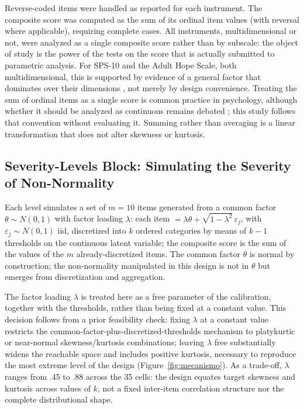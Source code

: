 \documentclass[man,mask,donotrepeattitle,floatsintext]{apa7}
\begin{document}
Reverse-coded items were handled as reported for each instrument. The composite score was computed as the sum of its ordinal item values (with reversal where applicable), requiring complete cases. All instruments, multidimensional or not, were analyzed as a single composite score rather than by subscale: the object of study is the power of the tests on the score that is actually submitted to parametric analysis. For SPS-10 and the Adult Hope Scale, both multidimensional, this is supported by evidence of a general factor that dominates over their dimensions \parencite{sischka2025,gomez2014}, not merely by design convenience. Treating the sum of ordinal items as a single score is common practice in psychology, although whether it should be analyzed as continuous remains debated \parencite{viljoen2015}; this study follows that convention without evaluating it. Summing rather than averaging is a linear transformation that does not alter skewness or kurtosis.

\subsection{Severity-Levels Block: Simulating the Severity of Non-Normality}
\label{sec:niveles}

Each level simulates a set of $m=10$ items generated from a common factor $\theta \sim N(0,1)$ with factor loading $\lambda$: each item $= \lambda\theta + \sqrt{1-\lambda^2}\,\varepsilon_j$, with $\varepsilon_j \sim N(0,1)$ iid, discretized into $k$ ordered categories by means of $k-1$ thresholds on the continuous latent variable; the composite score is the sum of the values of the $m$ already-discretized items. The common factor $\theta$ is normal by construction; the non-normality manipulated in this design is not in $\theta$ but emerges from discretization and aggregation.

The factor loading $\lambda$ is treated here as a free parameter of the calibration, together with the thresholds, rather than being fixed at a constant value. This decision follows from a prior feasibility check: fixing $\lambda$ at a constant value restricts the common-factor-plus-discretized-thresholds mechanism to platykurtic or near-normal skewness/kurtosis combinations; leaving $\lambda$ free substantially widens the reachable space and includes positive kurtosis, necessary to reproduce the most extreme level of the design (Figure~\ref{fig:mecanismo}). As a trade-off, $\lambda$ ranges from .45 to .88 across the 35 cells: the design equates target skewness and kurtosis across values of $k$, not a fixed inter-item correlation structure nor the complete distributional shape.
\end{document}
